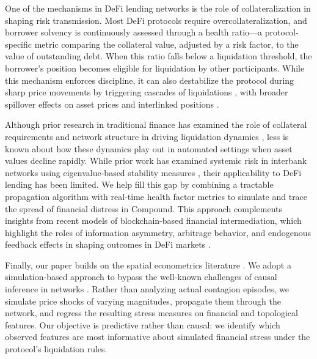 \documentclass[a4paper,UKenglish,cleveref, autoref, thm-restate]{informs3}
\DeclareRobustCommand{\latestrev}[1]{{\color{red}\hypersetup{linkcolor=red,citecolor=red,urlcolor=red}#1}}
\begin{document}
One of the mechanisms in DeFi lending networks is the role of collateralization in shaping risk transmission. Most DeFi protocols require overcollateralization, and borrower solvency is continuously assessed through a health ratio---a protocol-specific metric comparing the collateral value, adjusted by a risk factor, to the value of outstanding debt. When this ratio falls below a liquidation threshold, the borrower’s position \latestrev{becomes eligible for liquidation by other participants}. While this mechanism enforces discipline, it can also destabilize the protocol during sharp price movements by triggering cascades of liquidations \citep{sun2022liquidity}, with broader spillover effects on asset prices and interlinked positions \citep{qin2021liquidations,lehar2022systemic,gudgeon2020deficrisis}.

Although prior research in traditional finance has examined the role of collateral requirements and network structure in driving liquidation dynamics \citep{elsinger2006risk,nier2007network}, less is known about how these dynamics play out in automated settings when asset values decline rapidly. While prior work has examined systemic risk in interbank networks using eigenvalue-based stability measures \citep{caccioli2018network,glasserman2016contagion}, their applicability to DeFi lending has been limited. We help fill this gap by combining a tractable propagation algorithm with real-time health factor metrics to simulate and trace the spread of financial distress in Compound. This approach complements insights from recent models of blockchain-based financial intermediation, which highlight the roles of information asymmetry, arbitrage behavior, and endogenous feedback effects in shaping outcomes in DeFi markets \citep{cong2023inclusion,lehar2023battle}.


Finally, our paper builds on the spatial econometrics literature \citep{anselin1988spatial, LeSage2009}. We adopt a simulation-based approach to bypass the well-known challenges of causal inference in networks \citep{Manski, GibbonsOverman2012}. Rather than analyzing actual contagion episodes, we simulate price shocks of varying magnitudes, propagate them through the network, and regress the resulting stress measures on financial and topological features. \latestrev{Our objective is predictive rather than causal: we identify which observed features are most informative about simulated financial stress under the protocol's liquidation rules.}
\end{document}
